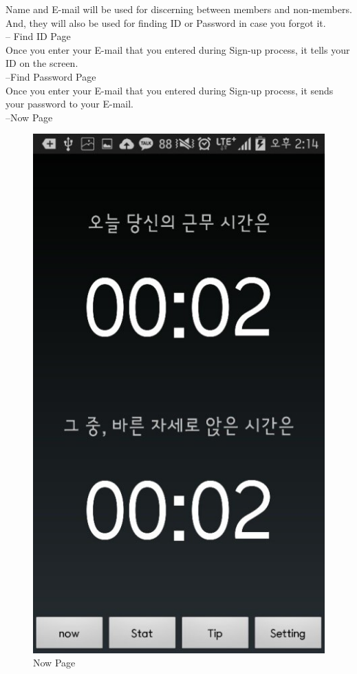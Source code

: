 \documentclass[conference]{IEEEtran}
\begin{document}
 Name and E-mail will be used for discerning between members and non-members. And, they will also be used for finding ID or Password in case you forgot it.\\

 -- Find ID Page\\

 Once you enter your E-mail that you entered during Sign-up process, it tells your ID on the screen.\\

 --Find Password Page\\

 Once you enter your E-mail that you entered during Sign-up process, it sends your password to your E-mail.\\
 
 --Now Page
 
\begin{figure}[h]
\begin{center}
    \includegraphics[scale=1]{img_12}
    \caption{Now Page} 
\end{center}
\end{figure}
\end{document}
